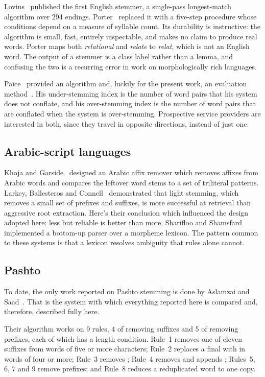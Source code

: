 \documentclass[conference]{IEEEtran}
\newcommand{\ps}[1]{{\pashtofont\textpashto{#1}}}
\begin{document}
Lovins~\cite{lovins1968} published the first English stemmer, a single-pass
longest-match algorithm over 294 endings. Porter~\cite{porter1980} replaced it
with a five-step procedure whose conditions depend on a measure of syllable
count. Its durability is instructive: the algorithm is small, fast, entirely
inspectable, and makes no claim to produce real words. Porter maps both
\emph{relational} and \emph{relate} to \emph{relat}, which is not an English
word. The output of a stemmer is a class label rather than a lemma, and
confusing the two is a recurring error in work on morphologically rich
languages.

Paice~\cite{paice1990} provided an algorithm and, luckily for the present work,
an evaluation method~\cite{paice1994}. His under-stemming index is the number
of word pairs that his system does not conflate, and his over-stemming index is
the number of word pairs that are conflated when the system is over-stemming.
Prospective service providers are interested in both, since they travel in
opposite directions, instead of just one.

\subsection{Arabic-script languages}

Khoja and Garside~\cite{khoja1999} designed an Arabic affix remover which
removes affixes from Arabic words and compares the leftover word stems to a set
of triliteral patterns. Larkey, Ballesteros and Connell~\cite{larkey2002}
demonstrated that light stemming, which removes a small set of prefixes and
suffixes, is more successful at retrieval than aggressive root extraction.
Here's their conclusion which influenced the design adopted here: less but
reliable is better than more. Sharifloo and Shamsfard~\cite{sharifloo2008}
implemented a bottom-up parser
over a morpheme lexicon. The pattern common to these systems is that a lexicon
resolves ambiguity that rules alone cannot.

\subsection{Pashto}

To date, the only work reported on Pashto stemming is done by Aslamzai and
Saad~\cite{aslamzai2015}. That is the system with which everything reported
here is compared and, therefore, described fully here.

Their algorithm works on 9 rules, 4 of removing suffixes and 5 of removing
prefixes, each of which has a length condition. Rule~1 removes one of eleven suffixes
from words of five or more characters; Rule~2 replaces a final \ps{ي} with
\ps{ه} in words of four or more; Rule~3 removes \ps{من}; Rule~4 removes
\ps{یز} and appends \ps{ه}; Rules~5, 6, 7 and 9 remove prefixes; and Rule~8
reduces a reduplicated word to one copy.
\end{document}
